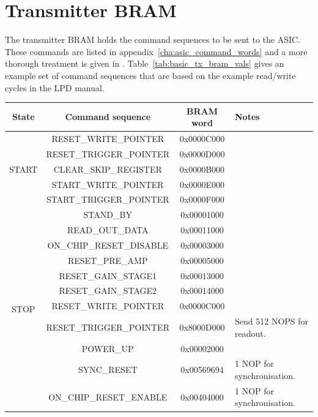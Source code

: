 \section{Transmitter BRAM} %
\label{sub:basic_transmitter_bram}
The transmitter BRAM holds the command sequences to be sent to the ASIC. These commands are listed in appendix~\ref{cha:asic_command_words} and a more thorough treatment is given in \cite{lpd_manual}. Table~\ref{tab:basic_tx_bram_vals} gives an example set of command sequences that are based on the example read/write cycles in the LPD manual\cite{lpd_manual}.
\begin{table}
    \begin{center}
        \begin{tabular}{c|c|c|l}
            State & Command sequence & BRAM word & Notes \\
            \hline
            \multirow{5}{*}{START}  
            & RESET\_WRITE\_POINTER   & 0x0000C000 & \\
            & RESET\_TRIGGER\_POINTER & 0x0000D000 & \\
            & CLEAR\_SKIP\_REGISTER   & 0x0000B000 & \\
            & START\_WRITE\_POINTER   & 0x0000E000 & \\
            & START\_TRIGGER\_POINTER & 0x0000F000 & \\
            \hline
            \multirow{12}{*}{STOP} 
            & STAND\_BY                & 0x00001000 & \\
            & READ\_OUT\_DATA          & 0x00011000 & \\
            & ON\_CHIP\_RESET\_DISABLE & 0x00003000 & \\
            & RESET\_PRE\_AMP          & 0x00005000 & \\
            & RESET\_GAIN\_STAGE1      & 0x00013000 & \\
            & RESET\_GAIN\_STAGE2      & 0x00014000 & \\
            & RESET\_WRITE\_POINTER    & 0x0000C000 & \\
            & RESET\_TRIGGER\_POINTER  & 0x8000D000 & Send 512 NOPS for readout. \\
            & POWER\_UP                & 0x00002000 & \\
            & SYNC\_RESET              & 0x00569694 & 1 NOP for synchronisation. \\
            & ON\_CHIP\_RESET\_ENABLE  & 0x00404000 & 1 NOP for synchronisation. \\

\end{tabular}
\end{center}
\end{table}
